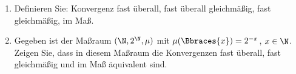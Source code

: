 
\begin{exercise}

\phantom{}

\begin{enumerate}[label = (\alph*)]

  \item
  Definieren Sie: Konvergenz fast überall, fast überall gleichmäßig, fast gleichmäßig, im Maß.
  
  \item
  Gegeben ist der Maßraum $(\N, 2^\N, \mu)$ mit $\mu(\Bbraces{x}) = 2^{-x}$, $x \in \N$. Zeigen Sie, dass in diesem Maßraum die Konvergenzen fast überall, fast gleichmäßig und im Maß äquivalent sind.

\end{enumerate}

\end{exercise}


